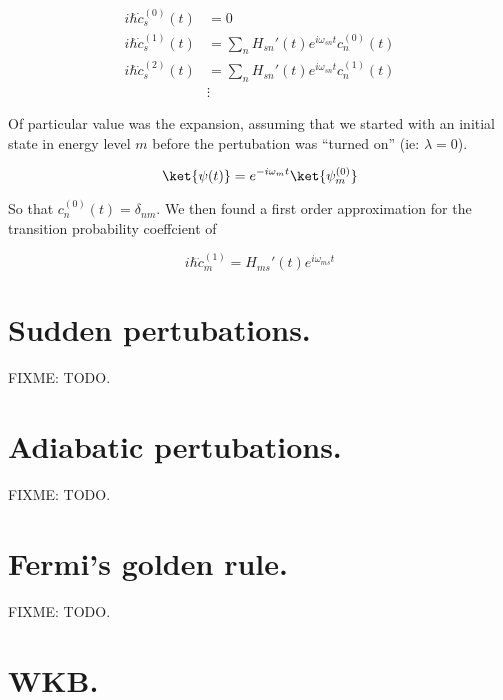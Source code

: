 \begin{equation}\label{eqn:qmTwoReview:n}
\begin{aligned}
i \hbar \dot{c}_s^{(0)}(t) &= 0  \\
i \hbar \dot{c}_s^{(1)}(t) &= \sum_{n} H_{sn}'(t) e^{i \omega_{sn} t} c_n^{(0)}(t) \\
i \hbar \dot{c}_s^{(2)}(t) &= \sum_{n} H_{sn}'(t) e^{i \omega_{sn} t} c_n^{(1)}(t) \\
&\vdots
\end{aligned}
\end{equation}

Of particular value was the expansion, assuming that we started with an initial state in energy level $m$ before the pertubation was ``turned on'' (ie: $\lambda = 0$).

\begin{equation}\label{eqn:qmTwoReview:n}
\ket{\psi(t)} = e^{-i \omega_m t} \ket{\psi_m^{(0)} }
\end{equation}

So that $c_n^{(0)}(t) = \delta_{nm}$.  We then found a first order approximation for the transition probability coeffcient of

\begin{equation}\label{eqn:qmTwoReview:n}
\boxed{
i \hbar \dot{c}_m^{(1)} = H_{ms}'(t) e^{i \omega_{ms} t}
}
\end{equation}

\section{Sudden pertubations.}

FIXME: TODO.

\section{Adiabatic pertubations.}

FIXME: TODO.

\section{Fermi's golden rule.}

FIXME: TODO.

\section{WKB.}

\EndNoBibArticle
